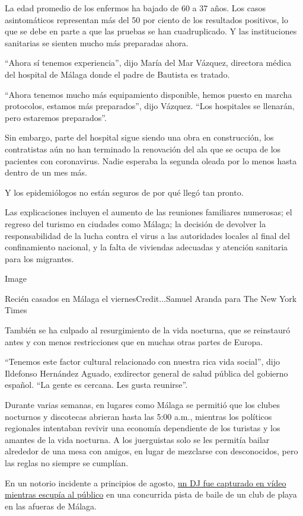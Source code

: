 La edad promedio de los enfermos ha bajado de 60 a 37 años. Los casos
asintomáticos representan más del 50 por ciento de los resultados
positivos, lo que se debe en parte a que las pruebas se han
cuadruplicado. Y las instituciones sanitarias se sienten mucho más
preparadas ahora.

``Ahora sí tenemos experiencia'', dijo María del Mar Vázquez, directora
médica del hospital de Málaga donde el padre de Bautista es tratado.

``Ahora tenemos mucho más equipamiento disponible, hemos puesto en
marcha protocolos, estamos más preparados'', dijo Vázquez. ``Los
hospitales se llenarán, pero estaremos preparados''.

Sin embargo, parte del hospital sigue siendo una obra en construcción,
los contratistas aún no han terminado la renovación del ala que se ocupa
de los pacientes con coronavirus. Nadie esperaba la segunda oleada por
lo menos hasta dentro de un mes más.

Y los epidemiólogos no están seguros de por qué llegó tan pronto.

Las explicaciones incluyen el aumento de las reuniones familiares
numerosas; el regreso del turismo en ciudades como Málaga; la decisión
de devolver la responsabilidad de la lucha contra el virus a las
autoridades locales al final del confinamiento nacional, y la falta de
viviendas adecuadas y atención sanitaria para los migrantes.

Image

Recién casados en Málaga el viernesCredit...Samuel Aranda para The New
York Times

También se ha culpado al resurgimiento de la vida nocturna, que se
reinstauró antes y con menos restricciones que en muchas otras partes de
Europa.

``Tenemos este factor cultural relacionado con nuestra rica vida
social'', dijo Ildefonso Hernández Aguado, exdirector general de salud
pública del gobierno español. ``La gente es cercana. Les gusta
reunirse''.

Durante varias semanas, en lugares como Málaga se permitió que los
clubes nocturnos y discotecas abrieran hasta las 5:00 a.m., mientras los
políticos regionales intentaban revivir una economía dependiente de los
turistas y los amantes de la vida nocturna. A los juerguistas solo se
les permitía bailar alrededor de una mesa con amigos, en lugar de
mezclarse con desconocidos, pero las reglas no siempre se cumplían.

En un notorio incidente a principios de agosto,
\href{https://www.rtve.es/noticias/20200803/coronavirus-torremolinos-cierra-discoteca-dj-escupio-publico/2036701.shtml}{un
DJ fue capturado en vídeo mientras escupía al público} en una concurrida
pista de baile de un club de playa en las afueras de Málaga.

